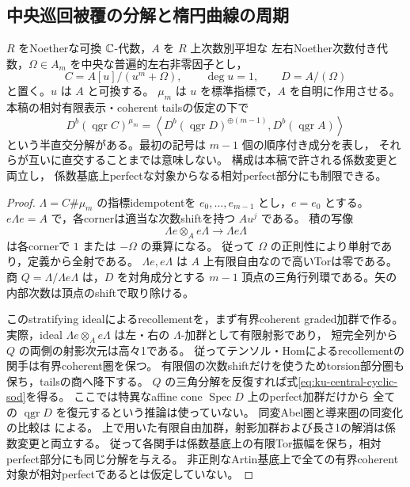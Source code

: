 \subsection{中央巡回被覆の分解と楕円曲線の周期}

\begin{lemma}[中央元に対する巡回被覆の分解]
\label{lem:ku-central-cyclic-sod}
$R$ をNoetherな可換 $\mathbb C$-代数，$A$ を $R$ 上次数別平坦な
左右Noether次数付き代数，$\Omega\in A_m$ を中央な普遍的左右非零因子とし，
\[
 C=A[u]/(u^m+\Omega),\qquad \deg u=1,\qquad D=A/(\Omega)
\]
と置く。$u$ は $A$ と可換する。
$\mu_m$ は $u$ を標準指標で，$A$ を自明に作用させる。
本稿の相対有限表示・coherent tailsの仮定の下で
\begin{equation}\label{eq:ku-central-cyclic-sod}
 D^b(\operatorname{qgr}C)^{\mu_m}
 =\left\langle
    D^b(\operatorname{qgr}D)^{\oplus(m-1)},
    D^b(\operatorname{qgr}A)
   \right\rangle
\end{equation}
という半直交分解がある。最初の記号は $m-1$ 個の順序付き成分を表し，
それらが互いに直交することまでは意味しない。
構成は本稿で許される係数変更と両立し，
係数基底上perfectな対象からなる相対perfect部分にも制限できる。
\end{lemma}
\begin{proof}
$\Lambda=C\#\mu_m$ の指標idempotentを $e_0,\ldots,e_{m-1}$ とし，$e=e_0$ とする。
$e\Lambda e=A$ で，各cornerは適当な次数shiftを持つ $Au^j$ である。
積の写像
\[
 \Lambda e\otimes_A e\Lambda\longrightarrow\Lambda e\Lambda
\]
は各cornerで $1$ または $-\Omega$ の乗算になる。
従って $\Omega$ の正則性により単射であり，定義から全射である。
$\Lambda e,e\Lambda$ は $A$ 上有限自由なので高いTorは零である。
商 $Q=\Lambda/\Lambda e\Lambda$ は，$D$ を対角成分とする
$m-1$ 頂点の三角行列環である。矢の内部次数は頂点のshiftで取り除ける。

このstratifying idealによるrecollementを，まず有界coherent graded加群で作る。
実際，ideal $\Lambda e\otimes_Ae\Lambda$ は左・右の $\Lambda$-加群として有限射影であり，
短完全列から $Q$ の両側の射影次元は高々1である。
従ってテンソル・Homによるrecollementの関手は有界coherent圏を保つ。
有限個の次数shiftだけを使うためtorsion部分圏も保ち，tailsの商へ降下する。
$Q$ の三角分解を反復すれば式\eqref{eq:ku-central-cyclic-sod}を得る。
ここでは特異なaffine cone $\operatorname{Spec}D$ 上のperfect加群だけから
全ての $\operatorname{qgr}D$ を復元するという推論は使っていない。
同変Abel圏と導来圏の同変化の比較は
\cite[Theorem~7.1]{Elagin2015}による。
上で用いた有限自由加群，射影加群および長さ1の解消は係数変更と両立する。
従って各関手は係数基底上の有限Tor振幅を保ち，相対perfect部分にも同じ分解を与える。
非正則なArtin基底上で全ての有界coherent対象が相対perfectであるとは仮定していない。
\end{proof}

